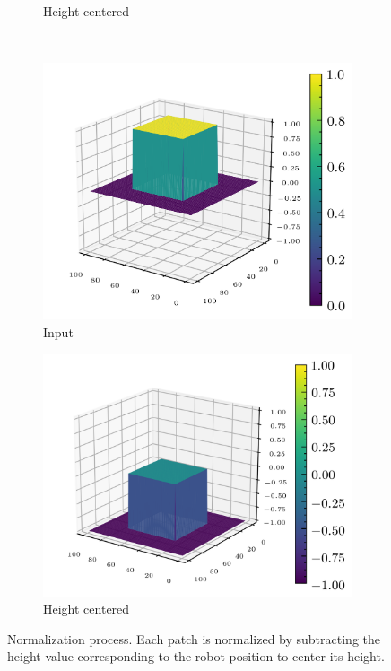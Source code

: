 \documentclass[../document.tex]{subfiles}
\begin{document}
\begin{figure}[H]
\begin{subfigure}[b]{0.32\textwidth}
        \caption{Height centered}
    \end{subfigure}  
    \\
          \begin{subfigure}[b]{0.32\textwidth}
        \includegraphics[width=\textwidth]{../img/data-aug/3d/square-middle.png}
        \caption{Input}
    \end{subfigure}
    \begin{subfigure}[b]{0.32\textwidth}
        \includegraphics[width=\textwidth]{../img/data-aug/3d/square-middle-center.png}
        \caption{Height centered}
    \end{subfigure}  
\caption{Normalization process. Each patch is normalized by subtracting the height value corresponding to the robot position to center its height. }
\label{fig: center}
\end{figure}
\end{document}
